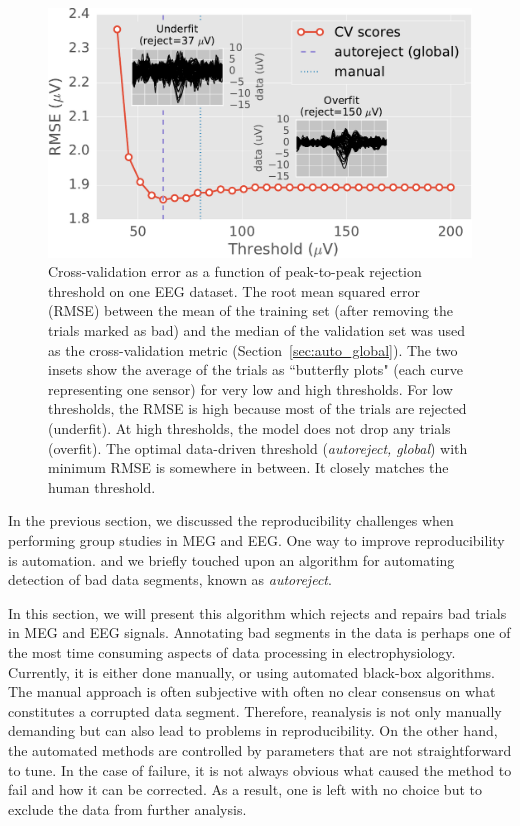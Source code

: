 \begin{figure}[t]
	\centering
	\includegraphics[width=0.8\linewidth]{figures/figure1.pdf}
    \caption[Cross-validation error as a function of peak-to-peak rejection threshold on one EEG dataset.]{Cross-validation error as a function of peak-to-peak rejection threshold on one EEG dataset. The root mean squared error (RMSE) between the mean of the training set (after removing the trials marked as bad) and the median of the validation set was used as the cross-validation metric (Section~\ref{sec:auto_global}). The two insets show the average of the trials as ``butterfly plots" (each curve representing one sensor) for very low and high thresholds. For low thresholds, the RMSE is high because most of the trials are rejected (underfit). At high thresholds, the model does not drop any trials (overfit). The optimal data-driven threshold (\emph{autoreject, global}) with minimum RMSE is somewhere in between. It closely matches the human threshold.}
    \label{fig:sommaire:cross_val}
\end{figure}

In the previous section, we discussed the reproducibility challenges when performing group studies in \ac{MEG} and \ac{EEG}. One way to improve reproducibility is automation. and we briefly touched upon an algorithm for automating detection of bad data segments, known as \emph{autoreject}.

In this section, we will present this algorithm which rejects and repairs bad trials in \ac{MEG} and \ac{EEG} signals. Annotating bad segments in the data is perhaps one of the most time consuming aspects of data processing in electrophysiology. Currently, it is either done manually, or using automated black-box algorithms. The manual approach is often subjective with often no clear consensus on what constitutes a corrupted data segment. Therefore, reanalysis is not only manually demanding but can also lead to problems in reproducibility. On the other hand, the automated methods are controlled by parameters that are not straightforward to tune. In the case of failure, it is not always obvious what caused the method to fail and how it can be corrected. As a result, one is left with no choice but to exclude the data from further analysis.

